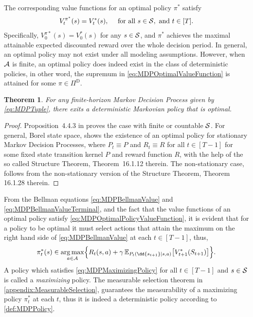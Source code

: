 \documentclass[
    a4paper,
    11pt,
    bibliography=totoc,
    listof=totoc,      
    headinclude=true,
    cleardoublepage=empty,
]{scrbook}
\theoremstyle{plain}
\newtheorem{theorem}{Theorem}[chapter]
\theoremstyle{definition}
\theoremstyle{remark}
\newcommand{\E}{\mathbb E}
\newcommand{\SpaceS}{{\cal S}}
\newcommand{\SpaceA}{{\cal A}}
\DeclareMathOperator*{\argmax}{arg\,max}
\begin{document}
The corresponding value functions for an optimal policy $\pi^*$ 
satisfy
\begin{equation}
\label{eq:MDPOptimalPolicyValueFunction}
    V^{\pi^*}_t(s) = V^*_t(s), 
    \quad \text{ for all } s\in\SpaceS, \text{ and } t\in[T].
\end{equation}
Specifically, $V^{\pi*}_0(s) = V^*_0(s)$ for any $s\in\SpaceS$, and $\pi^*$ 
achieves the maximal attainable expected discounted reward over the whole 
decision period. In general, an optimal policy may not exist under all 
modeling assumptions. However, when $\SpaceA$ is finite, an optimal policy 
does indeed exist in the class of deterministic policies, in other word, the 
supremum in \eqref{eq:MDPOptimalValueFunction} is attained for some 
$\pi\in\Pi^\text{D}$.
\begin{theorem}
\label{thm:MDPOptimalPolicyExistence}
    For any finite-horizon Markov Decision Process given by \eqref{eq:MDPTuple},
    there exits a deterministic Markovian policy that is optimal.
\end{theorem}
\begin{proof}
    Proposition~4.4.3 in \cite{puterman2005_mdpdsdp} proves the case with 
    finite or countable $\SpaceS$. For general, Borel state space, 
    \cite[Theorem~16.1.6]{hinderer2016_do} shows the existence of an optimal 
    policy for stationary Markov Decision Processes, where $P_t\equiv P$ and 
    $R_t\equiv R$ for all $t\in[T-1]$ for some fixed state transition kernel 
    $P$ and reward function $R$, with the help of the so called Structure 
    Theorem, Theorem~16.1.12 therein. The non-stationary case, follows from 
    the non-stationary version of the Structure Theorem, Theorem 16.1.28 
    therein.
\end{proof}

From the Bellman equations \eqref{eq:MDPBellmanValue} and 
\eqref{eq:MDPBellmanValueTerminal}, and the fact that the value functions of 
an optimal policy satisfy \eqref{eq:MDPOptimalPolicyValueFunction}, it 
is evident that for a policy to be optimal it must select actions that attain 
the maximum on the right hand side of \eqref{eq:MDPBellmanValue} at each 
$t\in[T-1]$, thus,
\begin{equation}
\label{eq:MDPMaximizingPolicy}
    \pi^*_t(s) \in \argmax_{a\in\SpaceA} \Bigl\{ 
        R_t(s,a) + \gamma\, \E_{P_t(\dd{s_{t+1}}|s,a)}\bigl[
            V^*_{t+1}(S_{t+1})
        \bigr] 
    \Bigr\}.
\end{equation}
%
A policy which satisfies \eqref{eq:MDPMaximizingPolicy} for all $t\in[T-1]$
and $s\in\SpaceS$ is called a \textit{maximizing} policy. The measurable 
selection theorem in \cref{appendix:MeasurableSelection}, guarantees the 
measurability of a maximizing policy $\pi^*_t$ at each $t$, thus it is indeed 
a deterministic policy according to \cref{def:MDPPolicy}.
\end{document}
